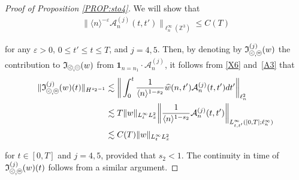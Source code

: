 \documentclass[%
11pt,  reqno]{amsart}
\newcommand{\pe}{\mathbin{\scaleobj{0.7}{\tikz \draw (0,0) node[shape=circle,draw,inner sep=0pt,minimum size=8.5pt] {\scriptsize  $=$};}}}
\newcommand{\pl}{\mathbin{\scaleobj{0.7}{\tikz \draw (0,0) node[shape=circle,draw,inner sep=0pt,minimum size=8.5pt] {\scriptsize $<$};}}}
\newcommand{\1}{\hspace{0.2mm}\text{I}\hspace{0.2mm}}
\newcommand{\noi}{\noindent}
\newcommand{\Z}{\mathbb{Z}}
\newcommand{\eps}{\varepsilon}
\newcommand{\ft}{\widehat}
\renewcommand{\l}{\ell}
\newcommand{\les}{\lesssim}
\newcommand{\jb}[1]
{\langle #1 \rangle}
\newcommand{\ind}{\mathbf 1}
\newcommand{\If}{\mathfrak{I}}
\newcommand{\A}{\mathcal{A}}
\numberwithin{equation}{section}
\numberwithin{theorem}{section}
\begin{document}
\begin{proof}[Proof of Proposition \ref{PROP:sto4}]
We will show that 
\begin{align}
\| \jb{n}^{-\eps} \A^{(j)}_{n} (t, t') \|_{\l^\infty_n(\Z^3)}
\leq C(T)
\label{A3}
\end{align}

\noi
for any $\eps >0$, $0 \leq t' \leq t \leq T$,  and  $j = 4, 5$.
Then, 
by denoting by $\If_{\pl, \pe}^{(j)}(w)$ the contribution to $\If_{\pl, \pe}(w)$
from $\ind_{n = n_1} \cdot \A_{n}^{(j)}$, 
it follows from \eqref{X6} and~\eqref{A3} that 
\begin{align}
\|\If_{\pl, \pe}^{(j)}(w)(t) \|_{H^{s_2 - 1}}
& \les \bigg\|\int_0^t 
\frac{1}{\jb{n}^{1-s_2}}
\ft w(n, t') \A_{n}^{(j)}(t, t') dt'
\bigg\|_{\l^2_n}\notag\\
& \les T  \|w\|_{L^\infty_t L^2_x}
\bigg\|\frac{1}{\jb{n}^{1-s_2}}
\A_{n}^{(j)} (t, t')
\bigg\|_{L^\infty_{t, t'}([0, T]; \l^\infty_{n})}\notag\\
& \les C(T)  \|w\|_{L^\infty_t L^2_x}
\label{A3a}
\end{align}

\noi
for $t \in [0, T]$ and $j = 4, 5$, provided that $s_2 < 1$.
The continuity in time of $\If_{\pl, \pe}^{(j)}(w)(t)$ follows from a similar argument.


\end{proof}
\end{document}

